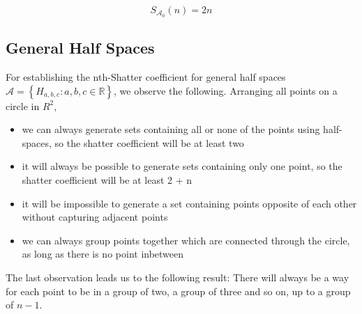 \documentclass[a4paper, 11pt]{article} %
\begin{document}
$$S_{\mathcal{A}_0}(n) = 2n$$

\subsection*{General Half Spaces}

For establishing the nth-Shatter coefficient for general half spaces $\mathcal { A } = \left\{ H _ { a , b , c } : a , b , c \in \mathbb { R } \right\}$, we observe the following. Arranging all points on a circle in $R^2$,

\begin{itemize}
\item we can always generate sets containing all or none of the points using half-spaces, so the shatter coefficient will be at least two
\item it will always be possible to generate sets containing only one point, so the shatter coefficient will be at least 2 + n
\item it will be impossible to generate a set containing points opposite of each other without capturing adjacent points 
\item we can always group points together which are connected through the circle, as long as there is no point inbetween
\end{itemize}

The last observation leads us to the following result: There will always be a way for each point to be in a group of two, a group of three and so on, up to a group of $n-1$.   

\end{document}
